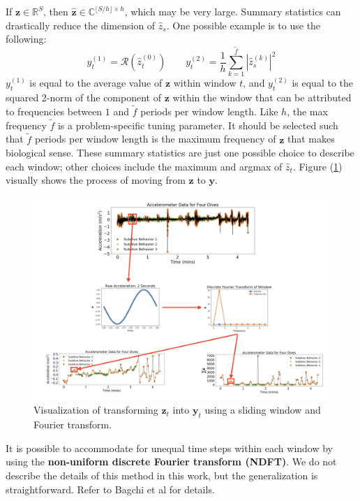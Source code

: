 If $\mathbf{z} \in \mathbb{R}^{S}$, then $\hat{\mathbf{z}} \in \mathbb{C}^{\lfloor S / h \rfloor \times h}$, which may be very large. Summary statistics can drastically reduce the dimension of $\hat{z}_s$. One possible example is to use the following:
%
$$y_t^{(1)} = \mathcal{R}\left(\hat{z}^{(0)}_t\right) \qquad y_t^{(2)} = \frac{1}{h}\sum_{k=1}^{\tilde{f}}|\hat{z}^{(k)}_s|^2$$
%
$y_t^{(1)}$ is equal to the average value of $\mathbf{z}$ within window $t$, and $y_t^{(2)}$ is equal to the squared 2-norm of the component of $\mathbf{z}$ within the window that can be attributed to frequencies between $1$ and $\tilde{f}$ periods per window length. Like $h$, the max frequency $\tilde{f}$ is a problem-specific tuning parameter. It should be selected such that $\tilde{f}$ periods per window length is the maximum frequency of $\mathbf{z}$ that makes biological sense. These summary statistics are just one possible choice to describe each window; other choices include the maximum and argmax of $\hat z_t$. Figure (\ref{fig:fourier_example}) visually shows the process of moving from $\mathbf{z}$ to $\mathbf{y}$.

\begin{figure}[ht]
	\centering
	\includegraphics[width=5in]{../Plots/fourier_transform.png}
	\caption{Visualization of transforming $\mathbf{z}_t$ into $\mathbf{y}_t$ using a sliding window and Fourier transform.}
	\label{fig:fourier_example}
\end{figure}

It is possible to accommodate for unequal time steps within each window by using the \textbf{non-uniform discrete Fourier transform (NDFT)}. We do not describe the details of this method in this work, but the generalization is straightforward. Refer to Bagchi et al \citep{Bagchi:1999} for details.

